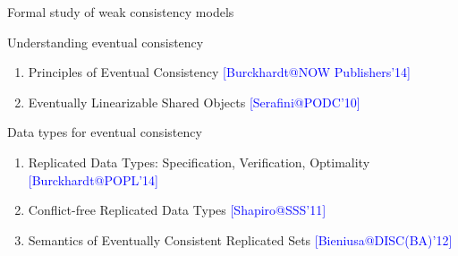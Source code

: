 \documentclass{beamer}
\makeatletter
\newcommand{\citeinbeamer}[3]{{\scriptsize{\textcolor{blue}{[#1@#2'#3]}}}}
\makeatother
\begin{document}
\begin{frame}{Formal study of weak consistency models}
  \begin{block}{Understanding eventual consistency}
    \begin{enumerate}
      \item Principles of Eventual Consistency \citeinbeamer{Burckhardt}{NOW
    Publishers}{14}
    \item Eventually Linearizable Shared Objects
    \citeinbeamer{Serafini}{PODC}{10}
    \end{enumerate}
  \end{block}

  \begin{block}{Data types for eventual consistency}
    \begin{enumerate}
      \item Replicated Data Types: Specification, Verification,
      Optimality \citeinbeamer{Burckhardt}{POPL}{14}
      \item Conflict-free Replicated Data Types \citeinbeamer{Shapiro}{SSS}{11}
      \item Semantics of Eventually Consistent Replicated Sets
      \citeinbeamer{Bieniusa}{DISC(BA)}{12}
    \end{enumerate}
  \end{block}
\end{frame}
\end{document}
